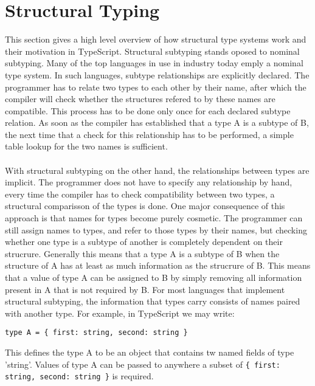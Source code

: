 \section{Structural Typing}
This section gives a high level overview of how structural type systems work and their motivation in TypeScript.
Structural subtyping stands oposed to nominal subtyping. 
Many of the top languages in use in industry today emply a nominal type system.
In such languages, subtype relationships are explicitly declared.
The programmer has to relate two types to each other by their name,
after which the compiler will check whether the structures refered to by these names are compatible.
This process has to be done only once for each declared subtype relation.
As soon as the compiler has established that a type A is a subtype of B,
the next time that a check for this relationship has to be performed, 
a simple table lookup for the two names is sufficient.
\\
\\
With structural subtyping on the other hand, the relationships between types are implicit.
The programmer does not have to specify any relationship by hand,
every time the compiler has to check compatibility between two types, a structural comparisson of the types is done.
One major consequence of this approach is that names for types become purely cosmetic.
The programmer can still assign names to types, and refer to those types by their names,
but checking whether one type is a subtype of another is completely dependent on their strucrure.
Generally this means that a type A is a subtype of B when the structure of A has at least as much information as the strucrure of B.
This means that a value of type A can be assigned to B by simply removing all information present in A that is not required by B.
For most languages that implement structural subtyping, the information that types carry consists of names paired with another type.
For example, in TypeScript we may write:

\begin{lstlisting}
type A = { first: string, second: string }
\end{lstlisting}



This defines the type A to be an object that contains tw named fields of type 'string'.
Values of type A can be passed to anywhere a subset of \texttt{\{ first: string, second: string \}} is required.
